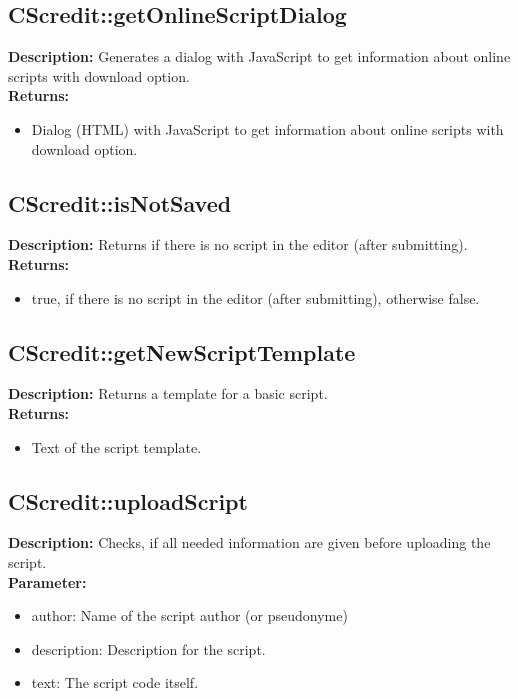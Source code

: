 \subsection{CScredit::getOnlineScriptDialog}
\textbf{Description:} Generates a dialog with JavaScript to get information about online scripts with download option.\\
\textbf{Returns:}
\begin{itemize}
\item Dialog (HTML) with JavaScript to get information about online scripts with download option.
\end{itemize}

\subsection{CScredit::isNotSaved}
\textbf{Description:} Returns if there is no script in the editor (after submitting).\\
\textbf{Returns:}
\begin{itemize}
\item true, if there is no script in the editor (after submitting), otherwise false.
\end{itemize}

\subsection{CScredit::getNewScriptTemplate}
\textbf{Description:} Returns a template for a basic script.\\
\textbf{Returns:}
\begin{itemize}
\item Text of the script template.
\end{itemize}

\subsection{CScredit::uploadScript}
\textbf{Description:} Checks, if all needed information are given before uploading the script.\\
\textbf{Parameter:}
\begin{itemize}
\item author: Name of the script author (or pseudonyme)
\item description: Description for the script.
\item text: The script code itself.
\end{itemize}

